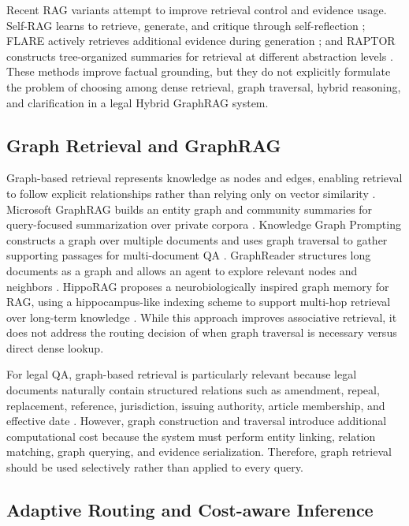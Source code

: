 \documentclass[11pt,twocolumn]{article}
\begin{document}
Recent RAG variants attempt to improve retrieval control and
evidence usage. Self-RAG learns to retrieve, generate, and
critique through self-reflection \cite{asai2023selfrag};
FLARE actively retrieves additional evidence during
generation \cite{jiang2023flare}; and RAPTOR constructs
tree-organized summaries for retrieval at different
abstraction levels \cite{sarthi2024raptor}. These methods
improve factual grounding, but they do not explicitly
formulate the problem of choosing among dense retrieval,
graph traversal, hybrid reasoning, and clarification in a
legal Hybrid GraphRAG system.

\subsection{Graph Retrieval and GraphRAG}

Graph-based retrieval represents knowledge as nodes and
edges, enabling retrieval to follow explicit relationships
rather than relying only on vector similarity
\cite{sun2019pullnet,wang2024kgp}. Microsoft GraphRAG
builds an entity graph and community summaries for
query-focused summarization over private corpora
\cite{edge2024graphrag}. Knowledge Graph Prompting
constructs a graph over multiple documents and uses graph
traversal to gather supporting passages for multi-document
QA \cite{wang2024kgp}. GraphReader structures long documents
as a graph and allows an agent to explore relevant nodes and
neighbors \cite{li2024graphreader}. HippoRAG proposes a
neurobiologically inspired graph memory for RAG, using a
hippocampus-like indexing scheme to support multi-hop
retrieval over long-term knowledge
\cite{gutierrez2024hipporag}. While this approach improves
associative retrieval, it does not address the routing
decision of when graph traversal is necessary versus direct
dense lookup.

For legal QA, graph-based retrieval is particularly relevant
because legal documents naturally contain structured
relations such as amendment, repeal, replacement, reference,
jurisdiction, issuing authority, article membership, and
effective date \cite{sovrano2020legalkg}. However, graph
construction and traversal introduce additional
computational cost because the system must perform entity
linking, relation matching, graph querying, and evidence
serialization. Therefore, graph retrieval should be used
selectively rather than applied to every query.

\subsection{Adaptive Routing and Cost-aware Inference}
\end{document}

